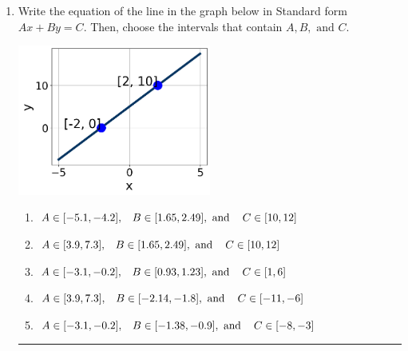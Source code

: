 \documentclass[14pt]{extbook}
\newcommand{\litem}[1]{\item#1\hspace*{-1cm}\rule{\textwidth}{0.4pt}}
\begin{document}
\begin{enumerate}
{\begin{enumerate}[label=\Alph*.]
\end{enumerate} }
\litem{
Write the equation of the line in the graph below in Standard form $Ax+By=C$. Then, choose the intervals that contain $A, B, \text{ and } C$.
\begin{center}
    \includegraphics[width=0.5\textwidth]{../Figures/linearGraphToStandardCopyA.png}
\end{center}
\begin{enumerate}[label=\Alph*.]
\item \( A \in [-5.1, -4.2], \hspace{3mm} B \in [1.65, 2.49], \text{ and } \hspace{3mm} C \in [10, 12] \)
\item \( A \in [3.9, 7.3], \hspace{3mm} B \in [1.65, 2.49], \text{ and } \hspace{3mm} C \in [10, 12] \)
\item \( A \in [-3.1, -0.2], \hspace{3mm} B \in [0.93, 1.23], \text{ and } \hspace{3mm} C \in [1, 6] \)
\item \( A \in [3.9, 7.3], \hspace{3mm} B \in [-2.14, -1.8], \text{ and } \hspace{3mm} C \in [-11, -6] \)
\item \( A \in [-3.1, -0.2], \hspace{3mm} B \in [-1.38, -0.9], \text{ and } \hspace{3mm} C \in [-8, -3] \)


\end{enumerate}}
\end{enumerate}
\end{document}
